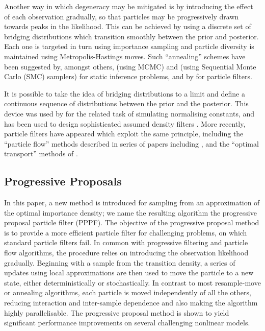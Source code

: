 \documentclass{article}
\begin{document}
Another way in which degeneracy may be mitigated is by introducing the effect of each observation gradually, so that particles may be progressively drawn towards peaks in the likelihood. This can be achieved by using a discrete set of bridging distributions which transition smoothly between the prior and posterior. Each one is targeted in turn using importance sampling and particle diversity is maintained using Metropolis-Hastings moves. Such ``annealing'' schemes have been suggested by, amongst others, \citet{Neal2001} (using MCMC) and \citet{DelMoral2006} (using Sequential Monte Carlo (SMC) samplers) for static inference problems, and by \citet{Godsill2001b,Gall2007,Deutscher2000,Oudjane2000} for particle filters.

It is possible to take the idea of bridging distributions to a limit and define a continuous sequence of distributions between the prior and the posterior. This device was used by \citet{Gelman1998} for the related task of simulating normalising constants, and has been used to design sophisticated assumed density filters \citep{Hanebeck2003a,Hanebeck2012,Hagmar2011}. More recently, particle filters have appeared which exploit the same principle, including the ``particle flow'' methods described in series of papers including \citep{Daum2008,Daum2011d}, and the ``optimal transport'' methods of \cite{Reich2011,Reich2012a}.

\subsection{Progressive Proposals}

In this paper, a new method is introduced for sampling from an approximation of the optimal importance density; we name the resulting algorithm the progressive proposal particle filter (PPPF). The objective of the progressive proposal method is to provide a more efficient particle filter for challenging problems, on which standard particle filters fail. In common with progressive filtering and particle flow algorithms, the procedure relies on introducing the observation likelihood gradually. Beginning with a sample from the transition density, a series of updates using local approximations are then used to move the particle to a new state, either deterministically or stochastically. In contrast to most resample-move or annealing algorithms, each particle is moved independently of all the others, reducing interaction and inter-sample dependence and also making the algorithm highly parallelisable. The progressive proposal method is shown to yield significant performance improvements on several challenging nonlinear models.
\end{document}
